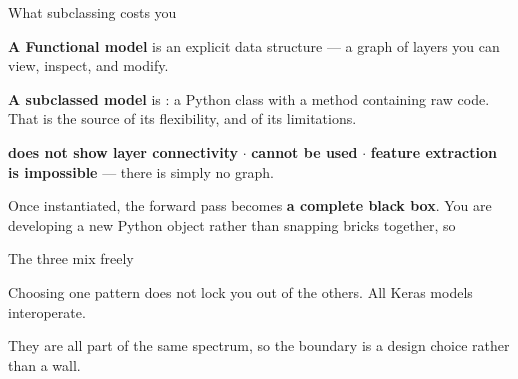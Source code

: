 \documentclass[aspectratio=169,11pt,t]{beamer}
\begin{document}
\begin{frame}[shrink=25]{What subclassing costs you}
\begin{minipage}[t]{0.485\textwidth}
{\fontsize{9.4}{12.6}\selectfont\color{fg2}\textbf{A Functional model} is an explicit data structure --- a graph of layers you can view, inspect, and modify.\par}\vskip 4pt
{\fontsize{9.4}{12.6}\selectfont\color{fg2}\textbf{A subclassed model} is : a Python class with a  method containing raw code. That is the source of its flexibility, and of its limitations.\par}\vskip 4pt

\end{minipage}%
\hfill
\begin{minipage}[t]{0.485\textwidth}
\begin{minipage}[t]{1.0\textwidth}
\begin{icardbad}
 \textbf{does not show layer connectivity} $\cdot$  \textbf{cannot be used} $\cdot$ \textbf{feature extraction is impossible} --- there is simply no graph.
\end{icardbad}
\end{minipage}%

\end{minipage}%
\begin{iband}[rose]
Once instantiated, the forward pass becomes \textbf{a complete black box}. You are developing a new Python object rather than snapping bricks together, so 
\end{iband}
\end{frame}

\begin{frame}[shrink=25]{The three mix freely}
{\fontsize{9.4}{12.6}\selectfont\color{fg2}Choosing one pattern does not lock you out of the others. All Keras models interoperate.\par}\vskip 4pt
\begin{minipage}[t]{0.485\textwidth}

\end{minipage}%
\hfill
\begin{minipage}[t]{0.485\textwidth}

\end{minipage}%
{\fontsize{9.4}{12.6}\selectfont\color{fg2}They are all part of the same spectrum, so the boundary is a design choice rather than a wall.\par}\vskip 4pt
\end{frame}
\end{document}
